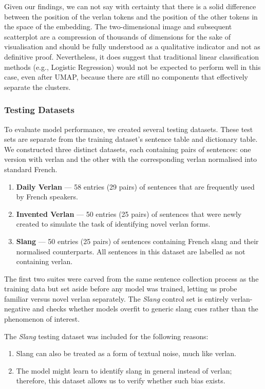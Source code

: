 \documentclass[12pt]{article}
\begin{document}
Given our findings, we can not say with certainty that there is a solid difference between the position of the verlan tokens and the position of the other tokens in the space of the embedding. 
The two-dimensional image and subsequent scatterplot are a compression of thousands of dimensions for the sake of visualisation and should be fully understood as a qualitative indicator and not as definitive proof. 
Nevertheless, it does suggest that traditional linear classification methods (e.g., Logistic Regression) would not be expected to perform well in this case, even after UMAP, because there are still no components that effectively separate the clusters.

\subsubsection{Testing Datasets}
To evaluate model performance, we created several testing datasets. 
These test sets are separate from the training dataset's sentence table and dictionary table. 
We constructed three distinct datasets, each containing pairs of sentences: one version with verlan and the other with the corresponding verlan normalised into standard French.

\begin{enumerate}
\item \textbf{Daily Verlan} --- 58 entries (29 pairs) of sentences that are frequently used by French speakers.
  \item \textbf{Invented Verlan} --- 50 entries (25 pairs) of sentences that were newly created to simulate the task of identifying novel verlan forms.
  \item \textbf{Slang} --- 50 entries (25 pairs) of sentences containing French slang and their normalised counterparts. All sentences in this dataset are labelled as not containing verlan.
\end{enumerate}

The first two suites were carved from the same sentence collection process as the training data but set aside before any model was trained, letting us probe familiar versus novel verlan separately. The \textit{Slang} control set is entirely verlan-negative and checks whether models overfit to generic slang cues rather than the phenomenon of interest.

The \textit{Slang} testing dataset was included for the following reasons:
\begin{enumerate}
  \item Slang can also be treated as a form of textual noise, much like verlan.
  \item The model might learn to identify slang in general instead of verlan; therefore, this dataset allows us to verify whether such bias exists.
\end{enumerate}
\end{document}
